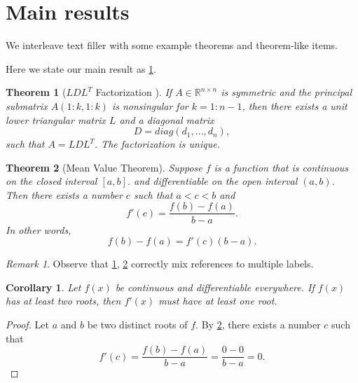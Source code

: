 \documentclass[10pt,reqno,final]{amsart}
\numberwithin{equation}{section}
\numberwithin{figure}{section}
\numberwithin{table}{section}
\theoremstyle{plain}
\newtheorem{theorem}{Theorem}[section]
\newtheorem{corollary}{Corollary}[section]
\theoremstyle{definition}
\theoremstyle{remark}
\newtheorem{remark}{Remark}[section]
\begin{document}
\section{Main results}
\label{sec:main}

We interleave text filler with some example theorems and theorem-like
items.

\lipsum[5]

Here we state our main result as \ref{thm:bigthm}.

\begin{theorem}[$LDL^T$ Factorization \cite{GoVa13}]\label{thm:bigthm}
  If $A \in \mathbb{R}^{n \times n}$ is symmetric and the principal
  submatrix $A(1:k,1:k)$ is nonsingular for $k=1:n-1$, then there
  exists a unit lower triangular matrix $L$ and a diagonal matrix
  \begin{displaymath}
    D = diag(d_1,\dots,d_n),  %
  \end{displaymath}
  such that $A=LDL^T$. The factorization is unique.
\end{theorem}

\lipsum[7]

\begin{theorem}[Mean Value Theorem]\label{thm:mvt}
  Suppose $f$ is a function that is continuous on the closed interval
  $[a,b]$.  and differentiable on the open interval $(a,b)$.
  Then there exists a number $c$ such that $a < c < b$ and
  \begin{displaymath}
    f'(c) = \frac{f(b)-f(a)}{b-a}.
  \end{displaymath}
  In other words,
  \begin{displaymath}
    f(b)-f(a) = f'(c)(b-a).
  \end{displaymath}
\end{theorem}

\begin{remark}
Observe that \ref{thm:bigthm}, \ref{thm:mvt} correctly mix references
to multiple labels.
\end{remark}



\begin{corollary}\label{cor:a}
  Let $f(x)$ be continuous and differentiable everywhere. If $f(x)$
  has at least two roots, then $f'(x)$ must have at least one root.
\end{corollary}
\begin{proof}
  Let $a$ and $b$ be two distinct roots of $f$.
  By \ref{thm:mvt}, there exists a number $c$ such that
  \begin{displaymath}
    f'(c) = \frac{f(b)-f(a)}{b-a} = \frac{0-0}{b-a} = 0.
  \end{displaymath}
\end{proof}
\end{document}
